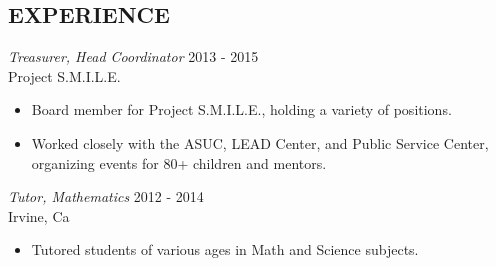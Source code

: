 \documentclass[margin, 8pt]{res} %
\begin{document}
\begin{resume}
\section{EXPERIENCE}
{\sl Treasurer, Head Coordinator} \hfill            2013 - 2015\\
                Project S.M.I.L.E.
                 \begin{itemize}  \itemsep -2pt %
                 \item Board member for Project S.M.I.L.E., holding a variety of positions.
                \item Worked closely with the ASUC, LEAD Center, and Public Service Center, organizing events for 80+ children and mentors.
                 \end{itemize}
{\sl Tutor, Mathematics} \hfill 2012 - 2014\\
		Irvine, Ca
		\begin{itemize} \itemsep -2pt
		\item Tutored students of various ages in Math and Science subjects.
		\end{itemize}






\end{resume}
\end{document}
